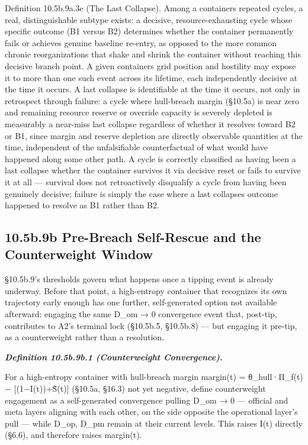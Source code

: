 \documentclass[
]{article}
\begin{document}
Definition 10.5b.9a.3e (The Last Collapse). Among a containers repeated
cycles, a real, distinguishable subtype exists: a decisive,
resource-exhausting cycle whose specific outcome (B1 versus B2)
determines whether the container permanently fails or achieves genuine
baseline re-entry, as opposed to the more common chronic reorganizations
that shake and shrink the container without reaching this decisive
branch point. A given containers grid position and hostility may expose
it to more than one such event across its lifetime, each independently
decisive at the time it occurs. A last collapse is identifiable at the
time it occurs, not only in retrospect through failure: a cycle where
hull-breach margin (§10.5a) is near zero and remaining resource reserve
or override capacity is severely depleted is measurably a near-miss last
collapse regardless of whether it resolves toward B2 or B1, since margin
and reserve depletion are directly observable quantities at the time,
independent of the unfalsifiable counterfactual of what would have
happened along some other path. A cycle is correctly classified as
having been a last collapse whether the container survives it via
decisive reset or fails to survive it at all --- survival does not
retroactively disqualify a cycle from having been genuinely decisive;
failure is simply the case where a last collapses outcome happened to
resolve as B1 rather than B2.

\hypertarget{b.9b-pre-breach-self-rescue-and-the-counterweight-window}{%
\subsection{10.5b.9b Pre-Breach Self-Rescue and the Counterweight
Window}\label{b.9b-pre-breach-self-rescue-and-the-counterweight-window}}

§10.5b.9's thresholds govern what happens once a tipping event is
already underway. Before that point, a high-entropy container that
recognizes its own trajectory early enough has one further,
self-generated option not available afterward: engaging the same D\_om →
0 convergence event that, post-tip, contributes to A2's terminal lock
(§10.5b.5, §10.5b.8) --- but engaging it pre-tip, as a counterweight
rather than a resolution.

\emph{\textbf{Definition 10.5b.9b.1 (Counterweight Convergence).}}

For a high-entropy container with hull-breach margin margin(t) =
θ\_hull·Π\_f(t) − {[}(1−I(t))+S̃(t){]} (§10.5a, §16.3) not yet negative,
define counterweight engagement as a self-generated convergence pulling
D\_om → 0 --- official and meta layers aligning with each other, on the
side opposite the operational layer's pull --- while D\_op, D\_pm remain
at their current levels. This raises I(t) directly (§6.6), and therefore
raises margin(t).
\end{document}
